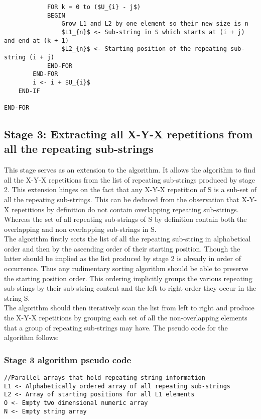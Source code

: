 \documentclass[12pt]{article}
\begin{document}
\begin{flushleft}
\begin{lstlisting}
			FOR k = 0 to ($U_{i} - j$)
			BEGIN                               
				Grow L1 and L2 by one element so their new size is n
				$L1_{n}$ <- Sub-string in S which starts at (i + j) and end at (k + 1)
				$L2_{n}$ <- Starting position of the repeating sub-string (i + j)
			END-FOR
		END-FOR
		i <- i + $U_{i}$
	END-IF
		
END-FOR		
\end{lstlisting}
	\newpage	
	\subsection{Stage 3: Extracting all X-Y-X repetitions from all the repeating sub-strings}
	This stage serves as an extension to the algorithm. It allows the algorithm to find all the X-Y-X repetitions from the list of repeating sub-strings produced by stage 2. This extension hinges on the fact that any X-Y-X repetition of S is a sub-set of all the repeating sub-strings. This can be deduced from the observation that X-Y-X repetitions by definition do not contain overlapping repeating sub-strings. Whereas the set of all repeating sub-strings of S by definition contain both the overlapping and non overlapping sub-strings in S.\\
	The algorithm firstly sorts the list of all the repeating sub-string in alphabetical order and then by the ascending order of their starting position. Though the latter should be implied as the list produced by stage 2 is already in order of occurrence. Thus any rudimentary sorting algorithm should be able to preserve the starting position order. This ordering implicitly groups the various repeating sub-stings by their sub-string content and the left to right order they occur in the string S.\\
	The algorithm should then iteratively scan the list from left to right and produce the X-Y-X repetitions by grouping each set of all the non-overlapping elements that a group of repeating sub-strings may have. The pseudo code for the algorithm follows:
	\newpage
	\subsubsection{Stage 3 algorithm pseudo code}
	
\begin{lstlisting}
//Parallel arrays that hold repeating string information
L1 <- Alphabetically ordered array of all repeating sub-strings 
L2 <- Array of starting positions for all L1 elements
O <- Empty two dimensional numeric array
N <- Empty string array


\end{lstlisting}
\end{flushleft}
\end{document}
